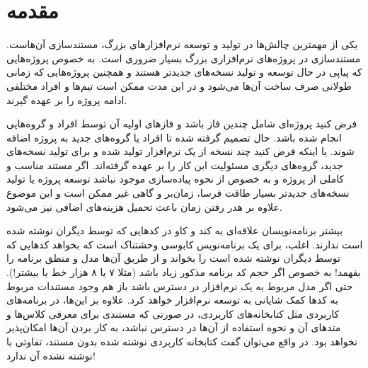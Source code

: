 

\chapter{مقدمه}

یکی از مهمترین چالش‌ها در تولید و توسعه نرم‌افزارهای بزرگ، مستندسازی آن‌هاست.
مستندسازی در پروژه‌های نرم‌افزاری بزرگ بسیار ضروری است. به خصوص پروژه‌هایی که
پیاپی در حال توسعه و تولید نسخه‌های جدیدتر هستند و همچنین پروژه‌هایی که زمانی
طولانی صرف ساخت آن‌ها می‌شود و در این مدت ممکن است تیم‌ها و افراد مختلفی ادامه
پروژه را بر عهده گیرند.

فرض کنید پروژه‌ای شامل چندین فاز باشد و فازهای اولیه آن توسط افراد و گروه‌هایی
انجام شده باشد. حال تصمیم گرفته شده تا افراد یا گروه‌های جدید به پروژه اضافه
شوند. یا اینکه فرض کنید چند نسخه از یک نرم‌افزار تولید شده و برای تولید نسخه‌های
جدید، گروه‌های دیگری مسئولیت این کار را بر عهده گرفته‌اند. اگر مستند مناسب و
کاملی از پروژه و به خصوص از نحوه پیاده‌سازی موجود نباشد توسعه پروژه یا تولید
نسخه‌های جدیدتر بسیار طاقت فرسا، زمان‌بر و گاهی غیر ممکن است و این موضوع علاوه بر هدر
رفتن زمان باعث تحمیل هزینه‌های اضافی نیز می‌شود.

بیشتر برنامه‌نویسان علاقه‌ای به کند و کاو در کدهایی که توسط دیگران نوشته شده است
ندارند. اغلب، برای یک برنامه‌نویس کابوسی وحشتناک است که بخواهد کدهایی که توسط
دیگران نوشته شده است را بخواند و از طریق آن‌ها مدل و منطق برنامه را بفهمد! به
خصوص اگر حجم کد برنامه مذکور زیاد باشد (مثلا ۷ یا ۸ هزار خط یا بیشتر!). حتی اگر
مدل مربوط به یک نرم‌افزار در دسترس باشد باز هم وجود مستندات مربوط به کدها کمک
شایانی به توسعه نرم‌افزار خواهد کرد.
علاوه بر این‌ها، در برنامه‌های کاربردی مثل کتابخانه‌های کاربردی، در صورتی که
مستندی برای معرفی کلاس‌ها و متدهای آن و نحوه استفاده از آن‌ها در دسترس نباشد، به
کار بردن آن‌ها امکان‌پذیر نخواهد بود. در واقع می‌توان گفت کتابخانه کاربردی نوشته
شده بدون مستند، تفاوتی با نوشته نشده آن ندارد!

